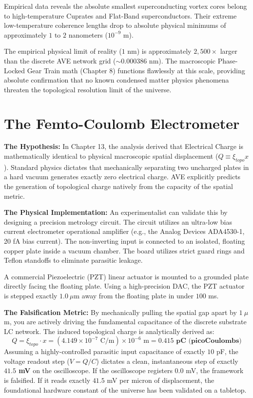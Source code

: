 Empirical data reveals the absolute smallest superconducting vortex cores belong to high-temperature Cuprates and Flat-Band superconductors. Their extreme low-temperature coherence lengths drop to absolute physical minimums of approximately $1 \text{ to } 2$ nanometers ($10^{-9}$ m). 

The empirical physical limit of reality ($1$ nm) is approximately $2,500\times$ larger than the discrete AVE network grid ($\sim 0.000386$ nm). The macroscopic Phase-Locked Gear Train math (Chapter 8) functions flawlessly at this scale, providing absolute confirmation that no known condensed matter physics phenomena threaten the topological resolution limit of the universe.\section{The Femto-Coulomb Electrometer}
\textbf{The Hypothesis:} In Chapter 13, the analysis derived that Electrical Charge is mathematically identical to physical macroscopic spatial displacement ($Q \equiv \xi_{topo} x$). Standard physics dictates that mechanically separating two uncharged plates in a hard vacuum generates exactly zero electrical charge. AVE explicitly predicts the generation of topological charge natively from the capacity of the spatial metric.

\textbf{The Physical Implementation:} An experimentalist can validate this by designing a precision metrology circuit. The circuit utilizes an ultra-low bias current electrometer operational amplifier (e.g., the Analog Devices ADA4530-1, 20 fA bias current). The non-inverting input is connected to an isolated, floating copper plate inside a vacuum chamber. The board utilizes strict guard rings and Teflon standoffs to eliminate parasitic leakage.

A commercial Piezoelectric (PZT) linear actuator is mounted to a grounded plate directly facing the floating plate. Using a high-precision DAC, the PZT actuator is stepped exactly $1.0 \ \mu$m away from the floating plate in under $100$ ms.

\textbf{The Falsification Metric:} By mechanically pulling the spatial gap apart by $1 \ \mu$m, you are actively driving the fundamental capacitance of the discrete substrate LC network. The induced topological charge is analytically derived as:
\begin{equation}
    Q = \xi_{topo} \cdot x = (4.149 \times 10^{-7} \text{ C/m}) \times 10^{-6} \text{ m} = \mathbf{0.415 \text{ pC (picoCoulombs)}}
\end{equation}
Assuming a highly-controlled parasitic input capacitance of exactly $10$ pF, the voltage readout step ($V = Q/C$) dictates a clean, instantaneous step of exactly \textbf{$41.5$ mV} on the oscilloscope. If the oscilloscope registers $0.0$ mV, the framework is falsified. If it reads exactly $41.5$ mV per micron of displacement, the foundational hardware constant of the universe has been validated on a tabletop.

